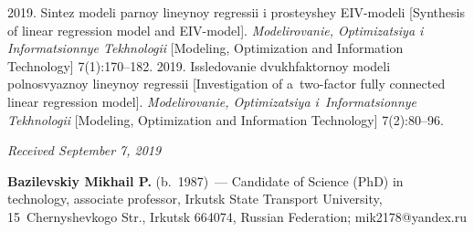 \begin{multicols}{2}
{{\begin{thebibliography}{99}
 2019. Sintez modeli parnoy lineynoy regressii i prosteyshey EIV-modeli 
[Synthesis of linear regression model and EIV-model]. \textit{Modelirovanie, 
Optimizatsiya i Informatsionnye Tekhnologii} [Modeling, Optimization and Information Technology] 
7(1):170--182.
 2019. Issledovanie dvukhfaktornoy modeli polnosvyaznoy lineynoy regressii 
[Investigation of a~two-factor fully connected linear regression model]. \textit{Modelirovanie, Optimizatsiya 
i~Informatsionnye Tekhnologii} [Modeling, Optimization and Information Technology] 7(2):80--96.

\end{thebibliography}

 }
 }

\end{multicols}

\vspace*{-6pt}

\hfill{\small\textit{Received September 7, 2019}}





\Contrl

\noindent
\textbf{Bazilevskiy Mikhail P.} (b.\ 1987)~--- Candidate of Science (PhD) in technology, associate 
professor, Irkutsk State Transport University, 15~Chernyshevkogo Str., Irkutsk 664074, Russian Federation; 
\mbox{mik2178@yandex.ru}
\label{end\stat}

\renewcommand{\bibname}{\protect\rm Литература} 